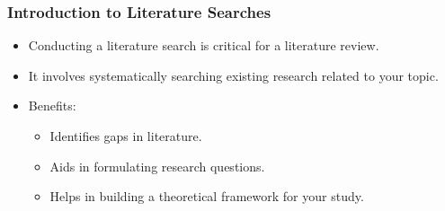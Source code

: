 \documentclass[aspectratio=169]{beamer}
\begin{document}
\begin{frame}[fragile]
    \frametitle{Introduction to Literature Searches}
    \begin{itemize}
        \item Conducting a literature search is critical for a literature review.
        \item It involves systematically searching existing research related to your topic.
        \item Benefits:
        \begin{itemize}
            \item Identifies gaps in literature.
            \item Aids in formulating research questions.
            \item Helps in building a theoretical framework for your study.
        \end{itemize}
    \end{itemize}
\end{frame}
\end{document}
